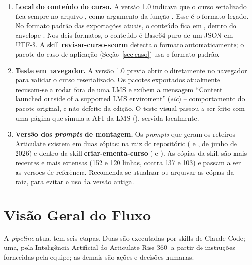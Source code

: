 \documentclass[12pt,a4paper]{article}
\newcommand{\skill}[1]{\textsf{\textbf{#1}}}
\begin{document}
\begin{enumerate}[leftmargin=*]
\item \textbf{Local do conteúdo do curso.} A versão 1.0 indicava que o curso serializado fica sempre no arquivo , como argumento da função . Esse é o formato legado. No formato padrão das exportações atuais, o conteúdo fica em , dentro do envelope . Nos dois formatos, o conteúdo é Base64 puro de um JSON em UTF-8. A skill \skill{revisar-curso-scorm} detecta o formato automaticamente; o pacote do caso de aplicação (Seção~\ref{sec:caso}) usa o formato padrão.

\item \textbf{Teste em navegador.} A versão 1.0 previa abrir o  diretamente no navegador para validar o curso reserializado. Os pacotes exportados atualmente recusam-se a rodar fora de uma LMS e exibem a mensagem ``Content launched outside of a supported LMS enviroment'' (\textit{sic}) -- comportamento do pacote original, e não defeito da edição. O teste visual passou a ser feito com uma página que simula a API da LMS (), servida localmente.

\item \textbf{Versão dos \textit{prompts} de montagem.} Os \textit{prompts} que geram os roteiros Articulate existem em duas cópias: na raiz do repositório ( e , de junho de 2026) e dentro da skill \skill{criar-ementa-curso} ( e ). As cópias da skill são mais recentes e mais extensas (152 e 120 linhas, contra 137 e 103) e passam a ser as versões de referência. Recomenda-se atualizar ou arquivar as cópias da raiz, para evitar o uso da versão antiga.
\end{enumerate}

\section{Visão Geral do Fluxo}\label{sec:visao}

A \textit{pipeline} atual tem seis etapas. Duas são executadas por skills do Claude Code; uma, pela Inteligência Artificial do Articulate Rise 360, a partir de instruções fornecidas pela equipe; as demais são ações e decisões humanas.
\end{document}
